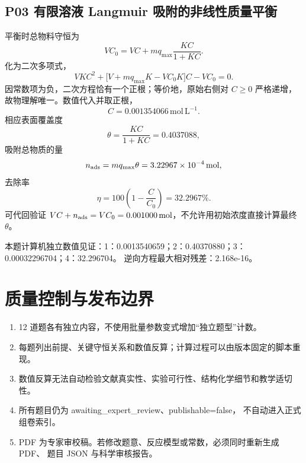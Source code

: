 \documentclass[UTF8,openany,11pt,a4paper]{ctexbook}
\begin{document}
\section{P03 \quad 有限溶液 Langmuir 吸附的非线性质量平衡}
平衡时总物料守恒为
\[
VC_0=VC+mq_{\max}\frac{KC}{1+KC}.
\]
化为二次多项式，
\[
VK C^2+\bigl[V+m q_{\max}K-VC_0K\bigr]C-VC_0=0.
\]
因常数项为负，二次方程恰有一个正根；等价地，原始右侧对 \(C\ge0\) 严格递增，故物理解唯一。数值代入并取正根，
\[
C=0.001354066\,\mathrm{mol\,L^{-1}}.
\]
相应表面覆盖度
\[
\theta=\frac{KC}{1+KC}=0.4037088,
\]
吸附总物质的量
\[
n_{\rm ads}=m q_{\max}\theta
=3.22967\times10^{-4}\,\mathrm{mol},
\]
去除率
\[
\eta=100\left(1-\frac{C}{C_0}\right)=32.2967\%.
\]
可代回验证 \(VC+n_{\rm ads}=VC_0=0.001000\,\mathrm{mol}\)，不允许用初始浓度直接计算最终 \(\theta\)。
\begin{reviewnote}
本题计算机独立数值见证：1：0.0013540659；2：0.40370880；3：0.00032296704；4：32.296704。
逆向方程最大相对残差：2.168e-16。
\end{reviewnote}
\chapter*{质量控制与发布边界}
\begin{enumerate}
\item 12 道题各有独立内容，不使用批量参数变式增加“独立题型”计数。
\item 每题列出前提、关键守恒关系和数值反算；计算过程可以由版本固定的脚本重现。
\item 数值反算无法自动检验文献真实性、实验可行性、结构化学细节和教学适切性。
\item 所有题目仍为 awaiting\_expert\_review、publishable=false，
不自动进入正式组卷索引。
\item PDF 为专家审校稿。若修改题意、反应模型或常数，必须同时重新生成 PDF、
题目 JSON 与科学审核报告。
\end{enumerate}
\end{document}
